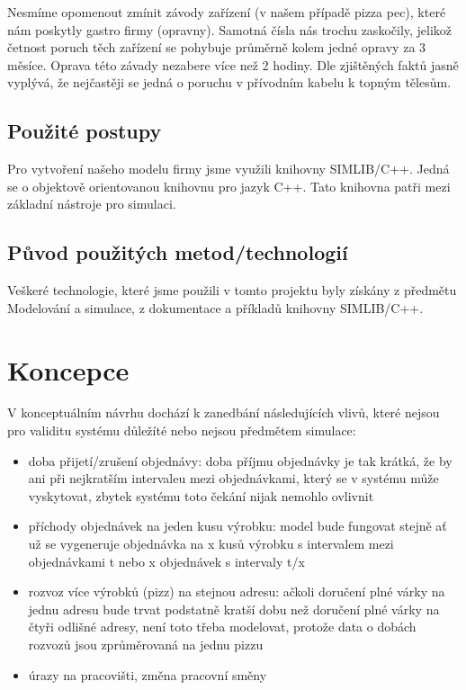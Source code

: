 \documentclass[a4paper, 12pt]{article}[9.12.2013]
\begin{document}
Nesmíme opomenout zmínit závody zařízení (v našem případě pizza pec), které nám
poskytly gastro firmy (opravny). Samotná čísla nás trochu zaskočily, jelikož
četnost poruch těch zařízení se pohybuje průměrně kolem jedné opravy za 3
měsíce. Oprava této závady nezabere více než 2 hodiny. Dle zjištěných faktů
jasně vyplývá, že nejčastěji se jedná o poruchu v přívodním kabelu k topným
tělesům.

\subsection{Použité postupy} \label{rozbor:postupy}
Pro vytvoření našeho modelu firmy jsme využili knihovny SIMLIB/C++. Jedná se o
objektově orientovanou knihovnu pro jazyk C++. Tato knihovna patři mezi
základní nástroje pro simulaci.
\subsection{Původ použitých metod/technologií} \label{rozbor:metody}
Veškeré technologie, které jsme použili v tomto projektu byly získány z
předmětu Modelování a simulace, z dokumentace a příkladů knihovny SIMLIB/C++.

\section{Koncepce} \label{koncepce}
V konceptuálním návrhu dochází k zanedbání následujících vlivů, které
nejsou pro validitu systému důležíté nebo nejsou předmětem simulace:
\begin{itemize}
\item doba přijetí/zrušení objednávy: doba příjmu objednávky je tak krátká,
že by ani při nejkratším intervaleu mezi objednávkami, který se v systému může
vyskytovat, zbytek systému toto čekání nijak nemohlo ovlivnit
\item příchody objednávek na jeden kusu výrobku: model bude fungovat stejně ať už
se vygeneruje objednávka na x kusů výrobku s intervalem mezi objednávkami t
nebo x objednávek s intervaly t/x
\item rozvoz více výrobků (pizz) na stejnou adresu: ačkoli
doručení plné várky na jednu adresu bude trvat podstatně kratší dobu než
doručení plné várky na čtyři odlišné adresy, není toto třeba modelovat, protože
data o dobách rozvozů jsou zprůměrovaná na jednu pizzu
\item úrazy na pracovišti, změna pracovní směny
\end{itemize}
\end{document}
